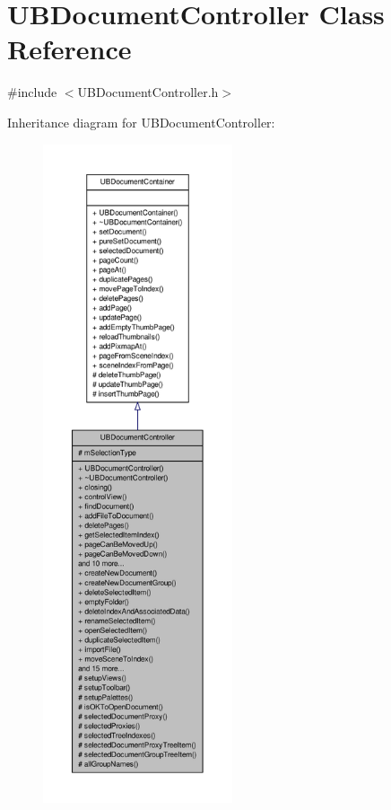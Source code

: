 \hypertarget{class_u_b_document_controller}{\section{U\-B\-Document\-Controller Class Reference}
\label{d6/de0/class_u_b_document_controller}
}


{\ttfamily \#include $<$U\-B\-Document\-Controller.\-h$>$}



Inheritance diagram for U\-B\-Document\-Controller\-:
\nopagebreak
\begin{figure}[H]
\begin{center}
\leavevmode
\includegraphics[height=550pt]{df/d7d/class_u_b_document_controller__inherit__graph}
\end{center}
\end{figure}


